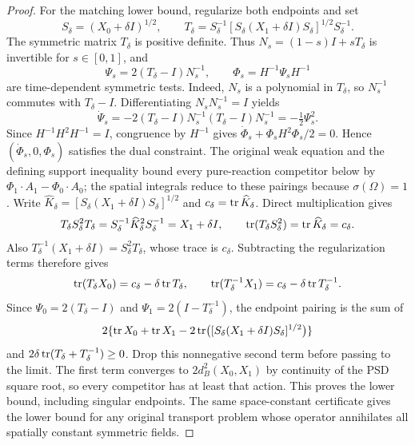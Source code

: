 \begin{proof}
For the matching lower bound, regularize both endpoints and set
\[
 S_\delta=(X_0+\delta I)^{1/2},\qquad
 T_\delta=S_\delta^{-1}
   [S_\delta(X_1+\delta I)S_\delta]^{1/2}S_\delta^{-1}.
\]
The symmetric matrix $T_\delta$ is positive definite. Thus
$N_s=(1-s)I+sT_\delta$ is invertible for $s\in[0,1]$, and
\[
 \Psi_s=2(T_\delta-I)N_s^{-1},\qquad
 \Phi_s=H^{-1}\Psi_sH^{-1}
\]
are time-dependent symmetric tests. Indeed, $N_s$ is a polynomial in
$T_\delta$, so $N_s^{-1}$ commutes with $T_\delta-I$. Differentiating
$N_sN_s^{-1}=I$ yields
\[
 \dot\Psi_s=-2(T_\delta-I)N_s^{-1}(T_\delta-I)N_s^{-1}
            =-\tfrac12\Psi_s^2.
\]
Since $H^{-1}H^2H^{-1}=I$, congruence by $H^{-1}$ gives
$\dot\Phi_s+\Phi_sH^2\Phi_s/2=0$. Hence
$(\dot\Phi_s,0,\Phi_s)$ satisfies the dual constraint. The original weak
equation and the defining support inequality bound every pure-reaction
competitor below by $\Phi_1\cdot A_1-\Phi_0\cdot A_0$; the spatial
integrals reduce to these pairings because $\sigma(\Omega)=1$.
Write $\widehat K_\delta=[S_\delta(X_1+\delta I)S_\delta]^{1/2}$ and
$c_\delta=\operatorname{tr}\widehat K_\delta$. Direct multiplication gives
\[
 T_\delta S_\delta^2T_\delta
 =S_\delta^{-1}\widehat K_\delta^2S_\delta^{-1}=X_1+\delta I,
 \qquad \operatorname{tr}(T_\delta S_\delta^2)=\operatorname{tr}\widehat K_\delta=c_\delta.
\]
Also $T_\delta^{-1}(X_1+\delta I)=S_\delta^2T_\delta$, whose trace is
$c_\delta$. Subtracting the regularization terms therefore gives
\[
 \operatorname{tr}(T_\delta X_0)=c_\delta-\delta\operatorname{tr} T_\delta,
 \qquad
 \operatorname{tr}(T_\delta^{-1}X_1)=c_\delta-\delta\operatorname{tr} T_\delta^{-1}.
\]
Since $\Psi_0=2(T_\delta-I)$ and
$\Psi_1=2(I-T_\delta^{-1})$, the endpoint pairing is the sum of
\[
 2\{\operatorname{tr} X_0+\operatorname{tr} X_1-
   2\operatorname{tr}\bigl([S_\delta(X_1+\delta I)S_\delta]^{1/2}\bigr)\}
\]
and $2\delta\operatorname{tr}(T_\delta+T_\delta^{-1})\ge0$.
Drop this nonnegative second term before passing to the limit. The first
term converges to $2d_B^2(X_0,X_1)$ by continuity of the PSD square root,
so every competitor has at least that action. This proves the lower bound,
including singular endpoints. The same space-constant certificate gives the lower bound for
any original transport problem whose operator annihilates all spatially
constant symmetric fields.
\end{proof}

